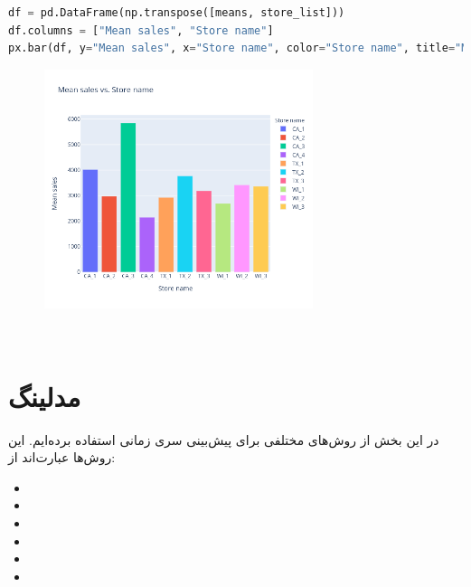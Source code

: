 \documentclass{article}
\begin{document}
\begin{latin}
\begin{lstlisting}[language=Python]
df = pd.DataFrame(np.transpose([means, store_list]))
df.columns = ["Mean sales", "Store name"]
px.bar(df, y="Mean sales", x="Store name", color="Store name", title="Mean sales vs. Store name")
\end{lstlisting}
\end{latin}
\pagebreak
\begin{figure}[hbt!]
	\centering
	\includegraphics[width=\textwidth,height=7cm]{Outputs/14.png}
\end{figure}
\ \\
\section{مدلینگ}
در این بخش از روش‌های مختلفی برای پیش‌بینی سری زمانی استفاده برده‌ایم. این روش‌ها عبارت‌اند از:
\begin{flushleft}
\begin{latin}
\begin{itemize}
\item
{}
\item
{}
\item
{}
\item
{}
\item
{}
\item
{}
\end{itemize}
\end{latin}
\end{flushleft}
\end{document}
